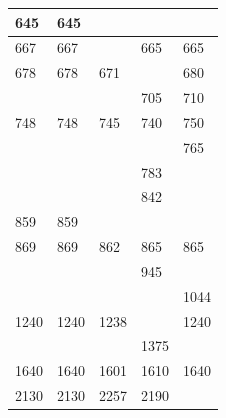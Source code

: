 \begin{table}[htb]
\begin{tabular}{|l|l|l|l|l|}
645                         & 645                         &                             &                             &                             \\ \hline
667                         & 667                         &                             & 665                         & 665                         \\ \hline
678                         & 678                         & 671                         &                             & 680                         \\ \hline
                            &                             &                             & 705                         & 710                         \\ \hline
748                         & 748                         & 745                         & 740                         & 750                         \\ \hline
                            &                             &                             &                             & 765                         \\ \hline
                            &                             &                             & 783                         &                             \\ \hline
                            &                             &                             & 842                         &                             \\ \hline
859                         & 859                         &                             &                             &                             \\ \hline
869                         & 869                         & 862                         & 865                         & 865                         \\ \hline
                            &                             &                             & {\color[HTML]{FE0000} 945}  &                             \\ \hline
                            &                             &                             &                             & 1044                        \\ \hline
{\color[HTML]{FFCB2F} 1240} & {\color[HTML]{FFCB2F} 1240} & {\color[HTML]{FFCB2F} 1238} &                             & {\color[HTML]{FFCB2F} 1240} \\ \hline
                            &                             &                             & {\color[HTML]{FE0000} 1375} &                             \\ \hline
{\color[HTML]{34FF34} 1640} & {\color[HTML]{34FF34} 1640} & {\color[HTML]{34FF34} 1601} & {\color[HTML]{34FF34} 1610} & {\color[HTML]{34FF34} 1640} \\ \hline
{\color[HTML]{34FF34} 2130} & {\color[HTML]{34FF34} 2130} & {\color[HTML]{34FF34} 2257} & {\color[HTML]{34FF34} 2190} &                             \\ \hline
\end{tabular}
\end{table}

